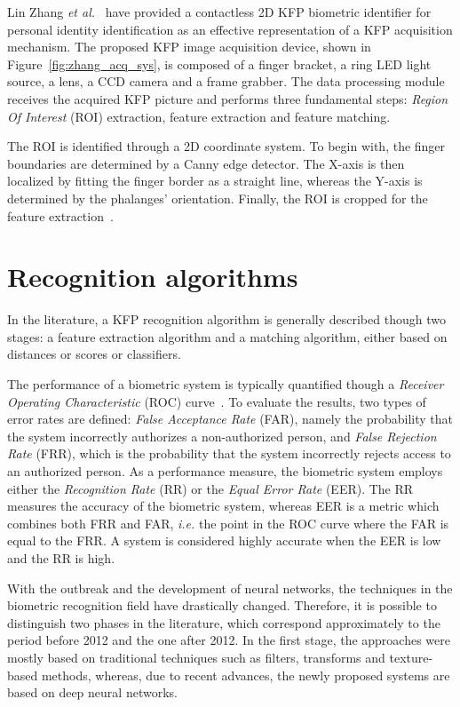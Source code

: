 \documentclass[journal]{IEEEtran}
\begin{document}
Lin Zhang \textit{et al.}~\cite{Zhang1} have provided a contactless 2D KFP biometric identifier for personal identity identification as an effective representation of a KFP acquisition mechanism. The proposed KFP image acquisition device, shown in Figure~\ref{fig:zhang_acq_sys}, is composed of a finger bracket, a ring LED light source, a lens, a CCD camera and a frame grabber. The data processing module receives the acquired KFP picture and performs three fundamental steps: \emph{Region Of Interest} (ROI) extraction, feature extraction and feature matching.

The ROI is identified through a 2D coordinate system. To begin with, the finger boundaries are determined by a Canny edge detector. The X-axis is then localized by fitting the finger border as a straight line, whereas the Y-axis is determined by the phalanges' orientation. Finally, the ROI is cropped for the feature extraction~\cite{LiWenwen}.

\section{Recognition algorithms}
\label{sec:recognitionalgorithms}
In the literature, a KFP recognition algorithm is generally described though two stages: a feature extraction algorithm and a matching algorithm, either based on distances or scores or classifiers.

The performance of a biometric system is typically quantified though a \emph{Receiver Operating Characteristic} (ROC) curve~\cite{Zhang1}\cite{ZHANG20111990}. To evaluate the results, two types of error rates are defined: \emph{False Acceptance Rate} (FAR), namely the probability that the system incorrectly authorizes a non-authorized person, and \emph{False Rejection Rate} (FRR), which is the probability that the system incorrectly rejects access to an authorized person. 
As a performance measure, the biometric system employs either the \emph{Recognition Rate} (RR) or the \emph{Equal Error Rate} (EER).
The RR measures the accuracy of the biometric system, whereas EER is a metric which combines both FRR and FAR, \textit{i.e.} the point in the ROC curve where the FAR is equal to the FRR. 
A system is considered highly accurate when the EER is low and the RR is high. 

With the outbreak and the development of neural networks, the techniques in the biometric recognition field have drastically changed. Therefore, it is possible to distinguish two phases in the literature, which correspond approximately to the period before 2012 and the one after 2012. In the first stage, the approaches were mostly based on traditional techniques such as filters, transforms and texture-based methods, whereas, due to recent advances, the newly proposed systems are based on deep neural networks.
\end{document}
